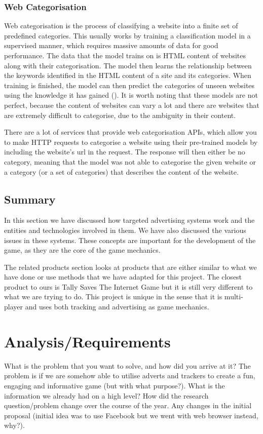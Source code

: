\documentclass{l4proj}
\begin{document}
\subsection{Web Categorisation}
Web categorisation is the process of classifying a website into a finite set of predefined categories. This usually works by training a classification model in a supervised manner, which requires massive amounts of data for good performance. The data that the model trains on is HTML content of websites along with their categorisation. The model then learns the relationship between the keywords identified in the HTML content of a site and its categories. When training is finished, the model can then predict the categories of unseen websites using the knowledge it has gained (\cite{webcat}). It is worth noting that these models are not perfect, because the content of websites can vary a lot and there are websites that are extremely difficult to categorise, due to the ambiguity in their content. 

There are a lot of services that provide web categorisation APIs, which allow you to make HTTP requests to categorise a website using their pre-trained models by including the website's url in the request. The response will then either be no category, meaning that the model was not able to categorise the given website or a category (or a set of categories) that describes the content of the website.

\section{Summary}
In this section we have discussed how targeted advertising systems work and the entities and technologies involved in them. We have also discussed the various issues in these systems. These concepts are important for the development of the game, as they are the core of the game mechanics. 

The related products section looks at products that are either similar to what we have done or use methods that we have adapted for this project. The closest product to ours is Tally Saves The Internet Game but it is still very different to what we are trying to do. This project is unique in the sense that it is multi-player and uses both tracking and advertising as game mechanics. 

\chapter{Analysis/Requirements}
What is the problem that you want to solve, and how did you arrive at it?
The problem is if we are somehow able to utilise adverts and trackers to create a fun, engaging and informative game (but with what purpose?). What is the information we already had on a high level? How did the research question/problem change over the course of the year. Any changes in the initial proposal (initial idea was to use Facebook but we went with web browser instead, why?).
\end{document}
